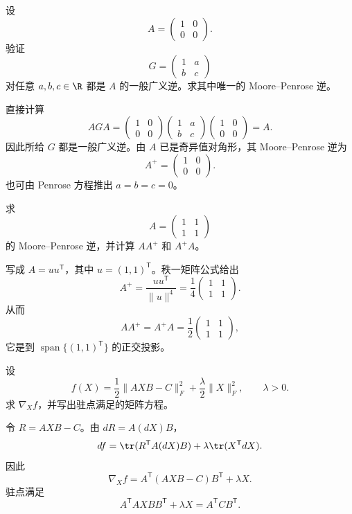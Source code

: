 \begin{exercise}[level=basic]
设
\[
A=\begin{pmatrix}1&0\\0&0\end{pmatrix}.
\]
验证
\[
G=\begin{pmatrix}1&a\\b&c\end{pmatrix}
\]
对任意 $a,b,c\in\R$ 都是 $A$ 的一般广义逆。求其中唯一的 Moore--Penrose 逆。
\begin{solution}
直接计算
\[
AGA
=\begin{pmatrix}1&0\\0&0\end{pmatrix}
\begin{pmatrix}1&a\\b&c\end{pmatrix}
\begin{pmatrix}1&0\\0&0\end{pmatrix}
=A.
\]
因此所给 $G$ 都是一般广义逆。由 $A$ 已是奇异值对角形，其 Moore--Penrose 逆为
\[
A^+=\begin{pmatrix}1&0\\0&0\end{pmatrix}.
\]
也可由 Penrose 方程推出 $a=b=c=0$。
\end{solution}
\end{exercise}

\begin{exercise}[level=basic]
求
\[
A=\begin{pmatrix}1&1\\1&1\end{pmatrix}
\]
的 Moore--Penrose 逆，并计算 $AA^+$ 和 $A^+A$。
\begin{solution}
写成 $A=uu^{\mathsf T}$，其中 $u=(1,1)^{\mathsf T}$。秩一矩阵公式给出
\[
A^+=\frac{uu^{\mathsf T}}{\lVert u\rVert^4}
=\frac14\begin{pmatrix}1&1\\1&1\end{pmatrix}.
\]
从而
\[
AA^+=A^+A
=\frac12\begin{pmatrix}1&1\\1&1\end{pmatrix},
\]
它是到 $\operatorname{span}\{(1,1)^{\mathsf T}\}$ 的正交投影。
\end{solution}
\end{exercise}

\begin{exercise}[level=standard]
设
\[
f(X)=\frac12\lVert AXB-C\rVert_F^2
+\frac\lambda2\lVert X\rVert_F^2,
\qquad \lambda>0.
\]
求 $\nabla_Xf$，并写出驻点满足的矩阵方程。
\begin{solution}
令 $R=AXB-C$。由 $dR=A(dX)B$，
\[
df=\tr(R^{\mathsf T}A(dX)B)
+\lambda\tr(X^{\mathsf T}dX).
\]
因此
\[
\nabla_Xf=A^{\mathsf T}(AXB-C)B^{\mathsf T}+\lambda X.
\]
驻点满足
\[
A^{\mathsf T}AXB B^{\mathsf T}+\lambda X
=A^{\mathsf T}CB^{\mathsf T}.
\]
\end{solution}
\end{exercise}


